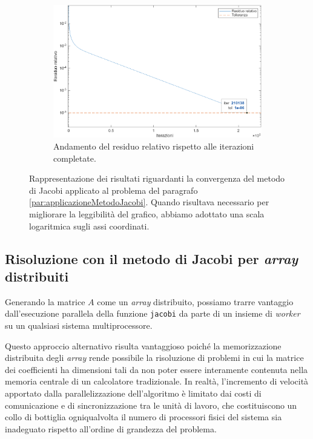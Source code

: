 \begin{figure}[!htbp]
        \vspace{1.5em}

        \begin{subfigure}{0.58\textwidth}
            \centering
            \includegraphics[width=\linewidth]{../Risorse/Capitolo 3/evoluzioneResiduoRelativo.png}
            \caption{Andamento del residuo relativo rispetto alle iterazioni completate.}
            \label{fig:evoluzioneResiduoRelativo}
        \end{subfigure}

        \caption{Rappresentazione dei risultati riguardanti la convergenza del metodo di Jacobi applicato al problema del paragrafo \ref{par:applicazioneMetodoJacobi}. Quando risultava necessario per migliorare la leggibilit\`a del grafico, abbiamo adottato una scala logaritmica sugli assi coordinati.}
        \label{fig:gruppoImmaginiAnalisiPrestazionale}
    \end{figure}
    \subsection{Risoluzione con il metodo di Jacobi per \textit{array} distribuiti}
    Generando la matrice $A$ come un \textit{array} distribuito, possiamo trarre vantaggio dall'esecuzione parallela della funzione \lstinline{jacobi} da parte
di un insieme di \textit{worker} su un qualsiasi sistema multiprocessore.

Questo approccio alternativo risulta vantaggioso poich\'e la memorizzazione distribuita degli \textit{array} rende possibile la risoluzione di problemi in cui la matrice dei coefficienti ha dimensioni
tali da non poter essere interamente contenuta nella memoria centrale di un calcolatore tradizionale.\newline
In realt\`a, l'incremento di velocit\`a apportato dalla parallelizzazione dell'algoritmo \`e limitato dai costi di comunicazione e di sincronizzazione tra le unit\`a di lavoro, che costituiscono un collo di bottiglia ogniqualvolta il numero di processori fisici del sistema sia inadeguato rispetto all'ordine di grandezza del problema.

